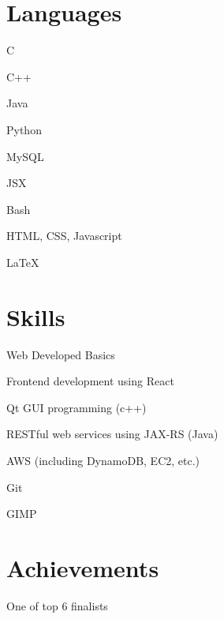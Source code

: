 \documentclass[]{deedy-resume-openfont}
\begin{document}
\begin{minipage}[t]{0.4\textwidth} 

\section{Languages} 
\hspace{0.5em}
\begin{tightemize}
\item C
\item C++
\item Java
\item Python
\end{tightemize}
\sectionsep
{}
\begin{tightemize}
\item MySQL
\item JSX
\item Bash
\item HTML, CSS, Javascript
\item \LaTeX
\end{tightemize}
\sectionsep

\section{Skills} 
\sectionsep
\begin{tightemize}
\item Web Developed Basics
\item Frontend development using React
\item Qt GUI programming (c++)
\item RESTful web services using JAX-RS (Java)
\item AWS (including DynamoDB, EC2, etc.)
\item Git
\item GIMP
\end{tightemize}
\sectionsep



\section{Achievements}
\sectionsep
\begin{tightemize}

\item {}
One of top 6 finalists

\item {}


\end{tightemize}
\end{minipage}
\end{document}

